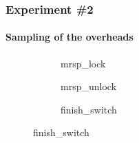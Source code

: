 

\begin{frame}

	\frametitle{Experiment \#2}
	\framesubtitle{Sampling of the overheads}

	\begin{figure}
    \centering
      \begin{subfigure}[b]{0.33\textwidth}
        \centering
        \resizebox{\linewidth}{!}\overheadsLock
        \caption{mrsp\_lock}
      \end{subfigure}
      \begin{subfigure}[b]{0.28\textwidth}
        \centering
        \resizebox{\linewidth}{!}\overheadsRelease
        \caption{mrsp\_unlock}
      \end{subfigure}
      \begin{subfigure}[b]{0.33\textwidth}
        \centering
        \resizebox{\linewidth}{!}\overheadsFS
        \caption{finish\_switch}
      \end{subfigure}
  \end{figure}

\end{frame}

